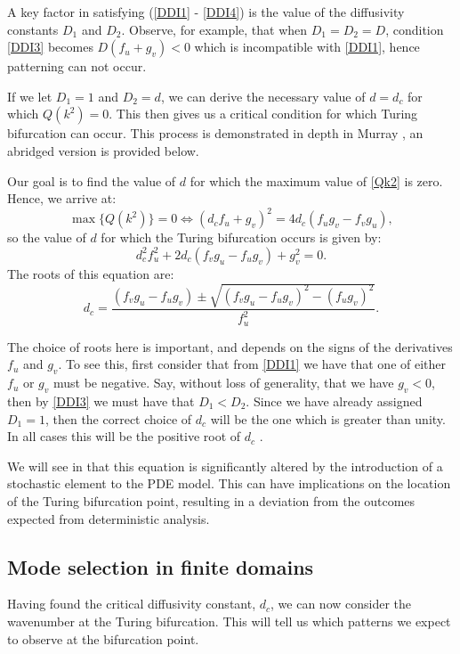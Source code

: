 \documentclass[12pt]{article}
\begin{document}
A key factor in satisfying (\ref{DDI1} - \ref{DDI4}) is the value of the diffusivity constants $D_1$ and $D_2$. Observe, for example, that when $D_1 = D_2 = D$, condition \eqref{DDI3} becomes $D(f_u + g_v)<0$ which is incompatible with \eqref{DDI1}, hence patterning can not occur.

If we let $D_1 = 1$ and $D_2 = d$, we can derive the necessary value of $d = d_c$ for which $Q(k^2) = 0$. This then gives us a critical condition for which Turing bifurcation can occur. This process is demonstrated in depth in Murray \cite{Murray}, an abridged version is provided below. 

Our goal is to find the value of $d$ for which the maximum value of \eqref{Qk2} is zero. Hence, we arrive at:
$$\max\lbrace Q(k^2)\rbrace = 0 \Longleftrightarrow (d_cf_u + g_v)^2 = 4d_c(f_ug_v - f_vg_u),$$
so the value of $d$ for which the Turing bifurcation occurs is given by:
\begin{equation} \label{eq8}
d_c^2f_u^2 + 2d_c(f_vg_u - f_ug_v) + g_v^2 = 0.
\end{equation}
The roots of this equation are:
\begin{equation} \label{eq9}
 d_c = \frac{(f_vg_u - f_ug_v) \pm \sqrt{(f_vg_u-f_ug_v)^2 - (f_ug_v)^2 }}{f_u^2}.
\end{equation}

The choice of roots here is important, and depends on the signs of the derivatives $f_u$ and $g_v$. To see this, first consider that from \eqref{DDI1} we have that one of either $f_u$ or $g_v$ must be negative. Say, without loss of generality, that we have $g_v < 0$, then by \eqref{DDI3} we must have that $D_1<D_2$. Since we have already assigned $D_1 = 1$, then the correct choice of $d_c$ will be the one which is greater than unity. In all cases this will be the positive root of $d_c$ \cite{Murray}. 

We will see in  that this equation is significantly altered by the introduction of a stochastic element to the PDE model. This can have implications on the location of the Turing bifurcation point, resulting in a deviation from the outcomes expected from deterministic analysis.  

\subsection{Mode selection in finite domains}

Having found the critical diffusivity constant, $d_c$, we can now consider the wavenumber at the Turing bifurcation. This will tell us which patterns we expect to observe at the bifurcation point. 
\end{document}
